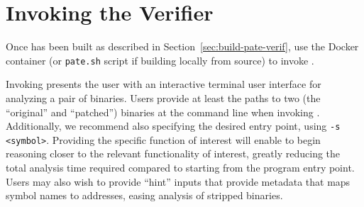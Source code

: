 
\section{Invoking the \pate{} Verifier}
\label{sec:run-pate-verif}

Once \pate{} has been built as described in Section~\ref{sec:build-pate-verif}, use the Docker container (or \texttt{pate.sh} script if building locally from source) to invoke \pate{}.

Invoking \pate{} presents the user with an interactive terminal user interface for analyzing a pair of binaries.
Users provide at least the paths to two (the ``original'' and ``patched'') binaries at the command line when invoking \pate{}.
Additionally, we recommend also specifying the desired entry point, using \texttt{-s <symbol>}.
Providing the specific function of interest will enable \pate{} to begin reasoning closer to the relevant functionality of interest, greatly reducing the total analysis time required compared to starting from the program entry point.
Users may also wish to provide ``hint'' inputs that provide metadata that maps symbol names to addresses, easing analysis of stripped binaries.

